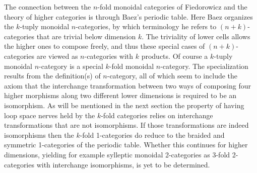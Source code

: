 \documentclass{tac}
\begin{document}
{            The connection between the $n$-fold monoidal categories of Fiedorowicz and the theory of higher categories
            is through Baez's periodic table.\cite{Baez1} Here Baez organizes the $k$-tuply monoidal $n$-categories, by which
            terminology he refers to
            $(n+k)$-categories  that are trivial
            below dimension $k.$ The triviality of lower cells allows the higher ones to compose freely, and thus
            these special cases of $(n+k)$-categories are viewed as $n$-categories with $k$ products.
            Of course a $k$-tuply monoidal $n$-category is a special $k$-fold monoidal $n$-category. The specialization
            results from the definition(s) of $n$-category, all of which seem to include the axiom that
            the interchange 
            transformation between two ways of composing four higher morphisms along two different lower dimensions
            is required to be an isomorphism. As will be mentioned in the next section the  property of having 
            loop space nerves held by the $k$-fold categories relies on interchange transformations that are not 
            isomorphisms. If those transformations are indeed isomorphisms then the $k$-fold 1-categories do reduce to 
            the braided and symmetric
            1-categories of the periodic table. Whether this continues for higher dimensions, yielding for 
            example sylleptic monoidal
            2-categories as 3-fold 2-categories with interchange isomorphisms, is yet to be determined.
            
}
\end{document}
